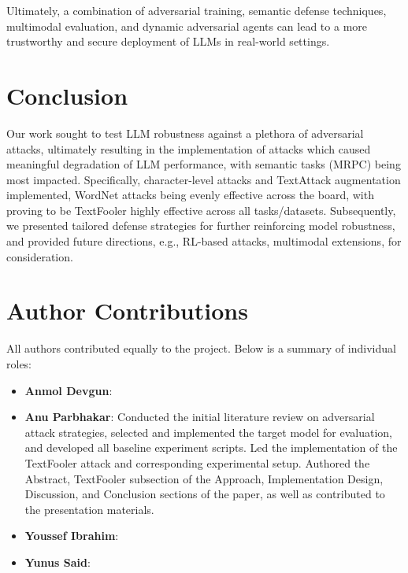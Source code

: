 \documentclass[conference]{IEEEtran}
\begin{document}
\bigskip
Ultimately, a combination of adversarial training, semantic defense techniques, multimodal evaluation, and dynamic adversarial agents can lead to a more trustworthy and secure deployment of LLMs in real-world settings.

\section{Conclusion}

Our work sought to test LLM robustness against a plethora of adversarial attacks, ultimately resulting in the implementation of attacks which caused meaningful degradation of LLM performance, with semantic tasks (MRPC) being most impacted. Specifically, character-level attacks and TextAttack augmentation implemented, WordNet attacks being evenly effective across the board, with proving to be TextFooler highly effective across all tasks/datasets. Subsequently, we presented tailored defense strategies for further reinforcing model robustness, and provided future directions, e.g., RL-based attacks, multimodal extensions, for consideration.


\section*{Author Contributions}

All authors contributed equally to the project. Below is a summary of individual roles:

\begin{itemize}
    \item \textbf{Anmol Devgun}: 
    \item \textbf{Anu Parbhakar}: Conducted the initial literature review on adversarial attack strategies, selected and implemented the target model for evaluation, and developed all baseline experiment scripts. Led the implementation of the TextFooler attack and corresponding experimental setup. Authored the Abstract, TextFooler subsection of the Approach, Implementation Design, Discussion, and Conclusion sections of the paper, as well as contributed to the presentation materials.
 
    \item \textbf{Youssef Ibrahim}: 
    \item \textbf{Yunus Said}: 
\end{itemize}




\end{document}

